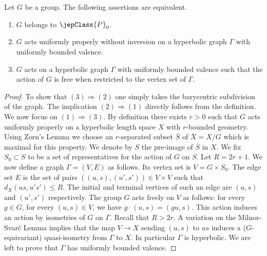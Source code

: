 \begin{proposition}\label{prop:graph}
Let $G$ be a group. The following assertions are equivalent.
\begin{enumerate}
\item $G$ belongs to $\jepClass{P}_0$.
\item $G$ acts uniformly properly without inversion on a hyperbolic graph $\Gamma$ with uniformly bounded valence.
\item $G$ acts on a hyperbolic graph $\Gamma$ with uniformly bounded valence such that the action of $G$ is free when restricted to the vertex set of $\Gamma$.
\end{enumerate}
\end{proposition}
\begin{proof}
To show that $(3)\Rightarrow(2)$ one simply takes the barycentric subdivision of the graph. The implication $(2)\Rightarrow(1)$ directly follows from the definition. We now focus on $(1)\Rightarrow(3)$. By definition there exists $r>0$ such that $G$ acts uniformly properly on a hyperbolic length space $X$ with $r$-bounded geometry. Using Zorn's Lemma we choose an $r$-separated subset $\bar S$ of $\bar X=X/G$ which is maximal for this property. We denote by $S$ the pre-image of $\bar S$ in $X$. We fix $S_0\subset S$ to be a set of representatives for the action of $G$ on $S$. Let $R=2r+1$. We now define a graph $\Gamma=(V,E)$ as follows. Its vertex set is $V=G\times S_0$. The edge set $E$ is the set of pairs $((u,s),(u',s'))\in V\times V$ such that $d_X(us,u's')\leqslant R$. The initial and terminal vertices of such an edge are $(u,s)$ and $(u',s')$ respectively. The group $G$ acts freely on $V$ as follows: for every $g\in G$, for every $(u,s)\in V$, we have $g\cdot(u,s)=(gu,s)$. This action induces an action by isometries of $G$ on $\Gamma$. Recall that $R>2r$. A variation on the Milnor-Svarč Lemma implies that the map $V\to X$ sending $(u,s)$ to $us$ induces a ($G$-equivariant) quasi-isometry from $\Gamma$ to $X$. In particular $\Gamma$ is hyperbolic. We are left to prove that $\Gamma$ has uniformly bounded valence.


\end{proof}
